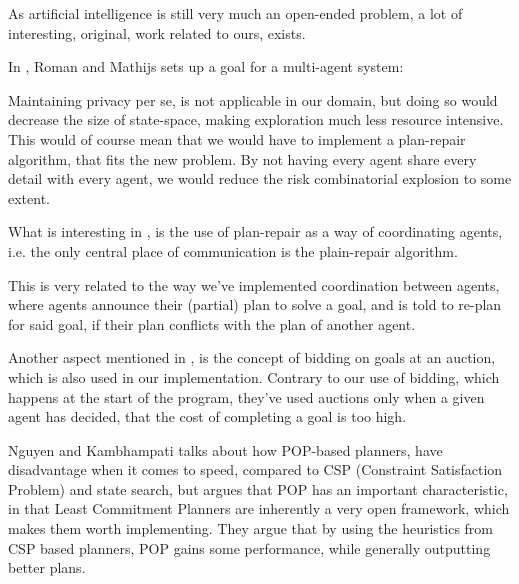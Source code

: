 \documentclass[Main]{subfiles}
\begin{document}
As artificial intelligence is still very much an open-ended problem, a lot of interesting, original, work related to ours, exists.

In \citep{VanderKrogt2005}, Roman and Mathijs sets up a goal for a multi-agent system:

Maintaining privacy per se, is not applicable in our domain, but doing so would decrease the size of state-space, 
making exploration much less resource intensive. 
This would of course mean that we would have to implement a plan-repair algorithm, that fits the new problem.
By not having every agent share every detail with every agent, we would reduce the risk combinatorial explosion to some extent.

What is interesting in \citep{VanderKrogt2005}, is the use of plan-repair as a way of coordinating agents, i.e. the only central place of communication is the plain-repair algorithm.

This is very related to the way we've implemented coordination between agents, where agents announce their (partial) plan to solve a goal, and is told to re-plan for said goal, if their plan conflicts with the plan of another agent.

Another aspect mentioned in \citep{VanderKrogt2005}, is the concept of bidding on goals at an auction, which is also used in our implementation.
Contrary to our use of bidding, which happens at the start of the program, they've used auctions only when a given agent has decided, that the cost of completing a goal is too high.

Nguyen and Kambhampati \citep{Nguyen2001} talks about how POP-based planners, have disadvantage when it comes to speed, compared to CSP (Constraint Satisfaction Problem) and state search, but argues that POP has an important characteristic, in that Least Commitment Planners are inherently a very open framework, which makes them worth implementing. 
They argue that by using the heuristics from CSP based planners, POP gains some performance, while generally outputting better plans.
\end{document}
